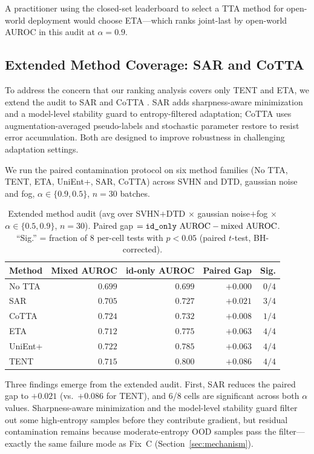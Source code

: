 A practitioner using the closed-set leaderboard to select a TTA method for open-world deployment would choose ETA---which ranks joint-last by open-world AUROC in this audit at $\alpha{=}0.9$.

\subsection{Extended Method Coverage: SAR and CoTTA}
\label{sec:extended_methods}

To address the concern that our ranking analysis covers only TENT and ETA, we extend the audit to SAR \citep{sar} and CoTTA \citep{cotta}.
SAR adds sharpness-aware minimization and a model-level stability guard to entropy-filtered adaptation; CoTTA uses augmentation-averaged pseudo-labels and stochastic parameter restore to resist error accumulation.
Both are designed to improve robustness in challenging adaptation settings.

We run the paired contamination protocol on six method families (No TTA, TENT, ETA, UniEnt+, SAR, CoTTA) across SVHN and DTD, gaussian noise and fog, $\alpha \in \{0.9, 0.5\}$, $n = 30$ batches.

\begin{table}[t]
\centering\small
\caption{%
  Extended method audit (avg over SVHN$+$DTD $\times$ gaussian noise$+$fog $\times$ $\alpha\in\{0.5,0.9\}$, $n{=}30$).
  Paired gap $= \texttt{id\_only}{} \text{ AUROC} - \text{mixed AUROC}$.
  ``Sig.'' = fraction of 8 per-cell tests with $p < 0.05$ (paired $t$-test, BH-corrected).
}
\label{tab:extended_audit}
\begin{tabular}{lrrrr}
\toprule
Method & Mixed AUROC & id-only AUROC & Paired Gap & Sig. \\
\midrule
No TTA    & $0.699$ & $0.699$ & $+0.000$ & $0/4$ \\
SAR       & $0.705$ & $0.727$ & $+0.021$ & $3/4$ \\
CoTTA     & $0.724$ & $0.732$ & $+0.008$ & $1/4$ \\
ETA       & $0.712$ & $0.775$ & $+0.063$ & $4/4$ \\
UniEnt+   & $0.722$ & $0.785$ & $+0.063$ & $4/4$ \\
TENT      & $0.715$ & $0.800$ & $+0.086$ & $4/4$ \\
\bottomrule
\end{tabular}
\end{table}

Three findings emerge from the extended audit.
First, SAR reduces the paired gap to $+0.021$ (vs.\ $+0.086$ for TENT), and 6/8 cells are significant across both $\alpha$ values.
Sharpness-aware minimization and the model-level stability guard filter out some high-entropy samples before they contribute gradient, but residual contamination remains because moderate-entropy OOD samples pass the filter---exactly the same failure mode as Fix~C (Section~\ref{sec:mechanism}).

